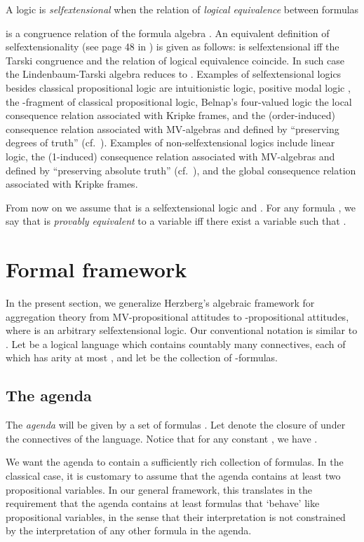 \documentclass{llncs}
\numberwithin{equation}{section}
\begin{document}
A logic  is \emph{selfextensional} when the relation of \emph{logical equivalence} between formulas

is a congruence relation of the formula algebra .
An equivalent definition of selfextensionality (see page 48 in \cite{FJa09}) is given as follows:  is selfextensional iff  the Tarski congruence  and the relation of logical equivalence  coincide. In such case the Lindenbaum-Tarski algebra reduces to . Examples of selfextensional logics besides classical propositional logic are intuitionistic logic, positive modal logic \cite{CeJa99}, the -fragment of classical propositional logic,  Belnap's four-valued logic \cite{Be77} the local consequence relation associated with Kripke frames, and the (order-induced) consequence relation associated with MV-algebras and defined by ``preserving degrees of truth'' (cf.\ \cite{Fo03}). Examples of non-selfextensional logics include linear logic, the (1-induced) consequence relation associated with MV-algebras and defined by ``preserving absolute truth'' (cf.\ \cite{Fo03}), and the global consequence relation associated with Kripke frames.

From now on we assume that  is a selfextensional logic and . For any formula , we say that  is \emph{provably equivalent} to a variable iff there exist a variable  such that .

\section{Formal framework}
\label{Sec:framework}
In the present section, we generalize Herzberg's algebraic framework for aggregation theory from MV-propositional attitudes to -propositional attitudes, where  is an arbitrary selfextensional logic. Our conventional notation is similar to \cite{He13}. Let  be a logical language which contains countably many connectives, each of which has arity at most , and let  be the collection of -formulas.

\subsection{The agenda}\label{subsec:agenda}

The \emph{agenda} will be given by a set of formulas . Let  denote the closure of  under the connectives of the language. Notice that for any constant , we have .

We want the agenda to contain a sufficiently rich collection of formulas.
In the classical case, it is customary to assume that the agenda contains at least two propositional variables.
In our general framework, this translates in the requirement that the agenda contains at least  formulas that `behave' like propositional variables, in the sense that their interpretation is not constrained by the interpretation of any other formula in the agenda.
\end{document}
